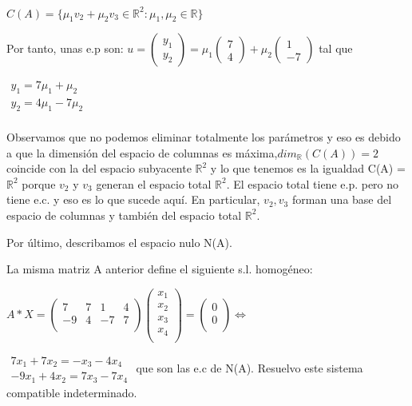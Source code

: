 \documentclass[11pt, a4paper]{article}
\newif\IfInSansMode
\newcommand{\R}{\mathbb{R}} \newcommand{\N}{\mathbb{N}}
\theoremstyle{theorem-style}
\theoremstyle{definition-style}
\theoremstyle{remark-style}
\theoremstyle{example-style}
\begin{document}
$C(A)= \{\mu_1v_2 + \mu_2v_3 \in \R^2: \mu_1,\mu_2 \in \R \}$

Por tanto, unas e.p son: $u = \begin{pmatrix} y_1 \\ y_2 \end{pmatrix} = \mu_1 \begin{pmatrix} 7 \\ 4 \end{pmatrix}+ \mu_2 \begin{pmatrix} 1 \\ -7 \end{pmatrix}$ tal que 

$\begin{array}{c}y_1=7\mu_1+\mu_2 \\y_2=4\mu_1-7\mu_2\\ \end{array} $

Observamos que no podemos eliminar totalmente los parámetros y eso es debido a que la dimensión del espacio de columnas es máxima,$dim_{\R}(C(A))=2$ coincide con la del espacio subyacente $\R^2$ y lo que tenemos es la igualdad C(A) = $\R^2$ porque $v_2$ y $v_3$ generan el espacio total $\R^2$. El espacio total tiene e.p. pero no tiene e.c. y eso es lo que sucede aquí. En particular, $v_2,v_3$ forman una base del espacio de columnas y también del espacio total $\R^2$.

Por último, describamos el espacio nulo N(A).

La misma matriz A anterior define el siguiente s.l. homogéneo:

$A * X = \begin{pmatrix}
7 & 7 & 1 & 4 \\
-9 & 4 & -7 & 7 \\
\end{pmatrix}\begin{pmatrix}
x_1 \\
x_2 \\
x_3 \\
x_4 \\
\end{pmatrix}=
\begin{pmatrix}
0 \\
0 \\
\end{pmatrix} \Leftrightarrow $

$\begin{array}{c} 7x_1+7x_2=-x_3-4x_4 \\ -9x_1+4x_2=7x_3-7x_4 \end{array} $ que son las e.c de N(A). Resuelvo este sistema compatible indeterminado.
\end{document}
